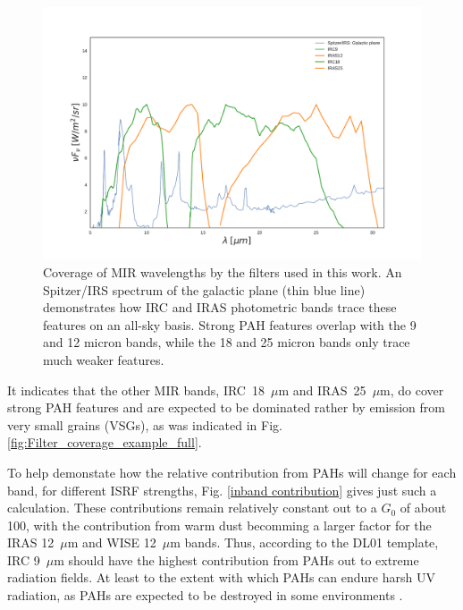          \begin{figure}
           \centering
           \includegraphics[width=\textwidth]{../Plots/ch_datasources/Filter_coverage_example_MIR.pdf}
           \caption{Coverage of MIR wavelengths by the filters used in this work. An Spitzer/IRS spectrum of the galactic plane (thin blue line) demonstrates how IRC and IRAS photometric bands trace these features on an all-sky basis. Strong PAH features overlap with the 9 and 12 micron bands, while the 18 and 25 micron bands only trace much weaker features. }
           \label{fig:Filter_coverage_example_MIR}
         \end{figure}
         It indicates that the other MIR bands, IRC~18~$\mu$m and IRAS~25~$\mu$m, do cover strong PAH features and are expected to be dominated rather by emission from very small grains (VSGs), as was indicated in Fig. \ref{fig:Filter_coverage_example_full}.

         To help demonstate how the relative contribution from PAHs will change for each band, for different ISRF strengths, Fig. \ref{inband contribution} gives just such a calculation. These contributions remain relatively constant out to a $G_{0}$ of about 100, with the contribution from warm dust becomming a larger factor for the IRAS 12~$\mu$m and WISE 12~$\mu$m bands. Thus, according to the DL01 template, IRC 9~$\mu$m should have the highest contribution from PAHs out to extreme radiation fields. At least to the extent with which PAHs can endure harsh UV radiation, as PAHs are expected to be destroyed in some environments \citep{allain96a,allain96b,pilleri12, pavlyuchenkov13}.

